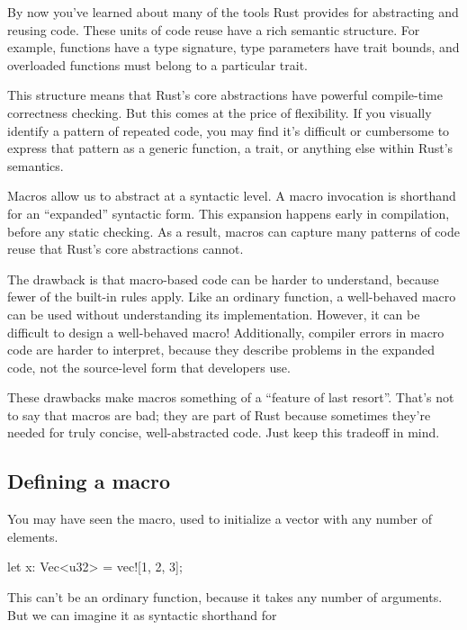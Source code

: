 By now you've learned about many of the tools Rust provides for abstracting and reusing code. These units of code reuse have a rich 
semantic structure. For example, functions have a type signature, type parameters have trait bounds, and overloaded functions must 
belong to a particular trait.

\blank

This structure means that Rust's core abstractions have powerful compile-time correctness checking. But this comes at the price of 
flexibility. If you visually identify a pattern of repeated code, you may find it's difficult or cumbersome to express that pattern 
as a generic function, a trait, or anything else within Rust's semantics.

\blank

Macros allow us to abstract at a syntactic level. A macro invocation is shorthand for an \enquote{expanded} syntactic form. This 
expansion happens early in compilation, before any static checking. As a result, macros can capture many patterns of code reuse that 
Rust's core abstractions cannot.

\blank

The drawback is that macro-based code can be harder to understand, because fewer of the built-in rules apply. Like an ordinary 
function, a well-behaved macro can be used without understanding its implementation. However, it can be difficult to design a 
well-behaved macro! Additionally, compiler errors in macro code are harder to interpret, because they describe problems in the 
expanded code, not the source-level form that developers use.

\blank

These drawbacks make macros something of a \enquote{feature of last resort}. That's not to say that macros are bad; they are part of 
Rust because sometimes they're needed for truly concise, well-abstracted code. Just keep this tradeoff in mind.

\subsection*{Defining a macro}

You may have seen the  macro, used to initialize a vector with any number of elements.

\begin{rustc}
let x: Vec<u32> = vec![1, 2, 3];
\end{rustc}

This can't be an ordinary function, because it takes any number of arguments. But we can imagine it as syntactic shorthand for

